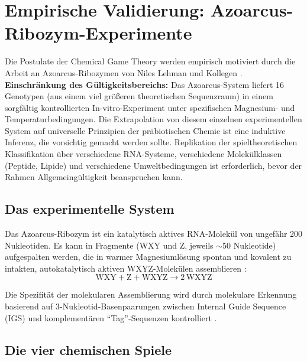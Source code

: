 \documentclass[12pt,a4paper]{article}
\theoremstyle{remark}
\begin{document}
\section{Empirische Validierung: Azoarcus-Ribozym-Experimente}
\label{sec:azoarcus}

Die Postulate der Chemical Game Theory werden empirisch motiviert durch die Arbeit an Azoarcus-Ribozymen von Niles Lehman und Kollegen \citep{AzoarcusPNAS,AzoarcusPMC}. \textbf{Einschr\"ankung des G\"ultigkeitsbereichs:} Das Azoarcus-System liefert 16 Genotypen (aus einem viel gr\"o\ss{}eren theoretischen Sequenzraum) in einem sorgf\"altig kontrollierten In-vitro-Experiment unter spezifischen Magnesium- und Temperaturbedingungen. Die Extrapolation von diesem einzelnen experimentellen System auf universelle Prinzipien der pr\"abiotischen Chemie ist eine induktive Inferenz, die vorsichtig gemacht werden sollte. Replikation der spieltheoretischen Klassifikation \"uber verschiedene RNA-Systeme, verschiedene Molek\"ulklassen (Peptide, Lipide) und verschiedene Umweltbedingungen ist erforderlich, bevor der Rahmen Allgemeing\"ultigkeit beanspruchen kann.

\subsection{Das experimentelle System}

Das Azoarcus-Ribozym ist ein katalytisch aktives RNA-Molek\"ul von ungef\"ahr 200 Nukleotiden. Es kann in Fragmente (WXY und Z, jeweils $\sim$50 Nukleotide) aufgespalten werden, die in warmer Magnesiuml\"osung spontan und kovalent zu intakten, autokatalytisch aktiven WXYZ-Molek\"ulen assemblieren \citep{AzoarcusPMC}:
\begin{equation}
\text{WXY} + \text{Z} + \text{WXYZ} \longrightarrow 2\,\text{WXYZ}
\end{equation}

Die Spezifit\"at der molekularen Assemblierung wird durch molekulare Erkennung basierend auf 3-Nukleotid-Basenpaarungen zwischen Internal Guide Sequence (IGS) und komplement\"aren ``Tag''-Sequenzen kontrolliert \citep{AzoarcusPNAS}.

\subsection{Die vier chemischen Spiele}
\end{document}
